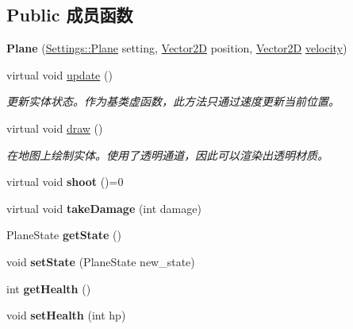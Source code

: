 \subsection*{Public 成员函数}
\begin{DoxyCompactItemize}
\item 
\mbox{\label{class_plane_ab0729538ddb380ca9a5b501f4cf72714}} 
{\bfseries Plane} (\hyperlink{struct_settings_1_1_plane}{Settings\+::\+Plane} setting, \hyperlink{structbasic__vector2_d}{Vector2D} position, \hyperlink{structbasic__vector2_d}{Vector2D} \hyperlink{class_entity_a386d25b56772b8913eb3e5adc636f6e0}{velocity})
\item 
virtual void \hyperlink{class_plane_a7fbb07f76503fe057772e01f542afc32}{update} ()
\begin{DoxyCompactList}\small\item\em 更新实体状态。作为基类虚函数，此方法只通过速度更新当前位置。 \end{DoxyCompactList}\item 
virtual void \hyperlink{class_plane_a8877358878e91929c4c01bad40cbdb78}{draw} ()
\begin{DoxyCompactList}\small\item\em 在地图上绘制实体。使用了透明通道，因此可以渲染出透明材质。 \end{DoxyCompactList}\item 
\mbox{\label{class_plane_af999499b5e79309d94004e8d012fe9c4}} 
virtual void {\bfseries shoot} ()=0
\item 
\mbox{\label{class_plane_a1a93dbb00292aaae274c152079f5f6f3}} 
virtual void {\bfseries take\+Damage} (int damage)
\item 
\mbox{\label{class_plane_a4b45bbcd85eb0ad999ab256f44b93fcc}} 
Plane\+State {\bfseries get\+State} ()
\item 
\mbox{\label{class_plane_a40cb32f3c42f1fc772be20448724d277}} 
void {\bfseries set\+State} (Plane\+State new\+\_\+state)
\item 
\mbox{\label{class_plane_ad63d1e65ff9ca0d8b0ea1f6d37c55388}} 
int {\bfseries get\+Health} ()
\item 
\mbox{\label{class_plane_a139404454150aac00b0f94b7f7d0d68e}} 
void {\bfseries set\+Health} (int hp)
\end{DoxyCompactItemize}
